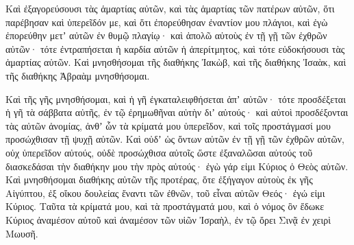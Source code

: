 {\par }{\PP {}Καὶ ἐξαγορεύσουσι τὰς ἁμαρτίας αὐτῶν, καὶ τὰς ἁμαρτίας τῶν πατέρων αὐτῶν, ὅτι παρέβησαν καὶ ὑπερεῖδόν με, καὶ ὅτι ἐπορεύθησαν ἐναντίον μου πλάγιοι,
καὶ ἐγὼ ἐπορεύθην μετʼ αὐτῶν ἐν θυμῷ πλαγίῳ· καὶ ἀπολῶ αὐτοὺς ἐν τῇ γῇ τῶν ἐχθρῶν αὐτῶν· τότε ἐντραπήσεται ἡ καρδία αὐτῶν ἡ ἀπερίτμητος, καὶ τότε εὐδοκήσουσι τὰς ἁμαρτίας αὐτῶν.
Καὶ μνησθήσομαι τῆς διαθήκης Ἰακὼβ, καὶ τῆς διαθήκης Ἰσαὰκ, καὶ τῆς διαθήκης Ἁβραὰμ μνησθήσομαι.
\par }{\PP {}Καὶ τῆς γῆς μνησθήσομαι, καὶ ἡ γῆ ἐγκαταλειφθήσεται ἀπʼ αὐτῶν· τότε προσδέξεται ἡ γῆ τὰ σάββατα αὐτῆς, ἐν τῷ ἐρημωθῆναι αὐτὴν διʼ αὐτούς· καὶ αὐτοὶ προσδέξονται τὰς αὐτῶν ἀνομίας, ἀνθʼ ὧν τὰ κρίματά μου ὑπερεῖδον, καὶ τοῖς προστάγμασί μου προσώχθισαν τῇ ψυχῇ αὐτῶν.
Καὶ οὐδʼ ὡς ὄντων αὐτῶν ἐν τῇ γῇ τῶν ἐχθρῶν αὐτῶν, οὐχ ὑπερεῖδον αὐτούς, οὐδὲ προσώχθισα αὐτοῖς ὥστε ἐξαναλῶσαι αὐτούς τοῦ διασκεδάσαι τὴν διαθήκην μου τὴν πρὸς αὐτούς· ἐγὼ γάρ εἰμι Κύριος ὁ Θεὸς αὐτῶν.
Καὶ μνησθήσομαι διαθήκης αὐτῶν τῆς προτέρας, ὅτε ἐξήγαγον αὐτοὺς ἐκ γῆς Αἰγύπτου, ἐξ οἴκου δουλείας ἔναντι τῶν ἐθνῶν, τοῦ εἶναι αὐτῶν Θεός· ἐγώ εἰμι Κύριος.
Ταῦτα τὰ κρίματά μου, καὶ τὰ προστάγματά μου, καὶ ὁ νόμος ὃν ἔδωκε Κύριος ἀναμέσον αὐτοῦ καὶ ἀναμέσον τῶν υἱῶν Ἰσραὴλ, ἐν τῷ ὄρει Σινᾷ ἐν χειρὶ Μωυσῆ.

}
